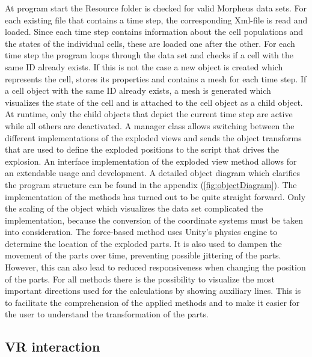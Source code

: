 At program start the Resource folder is checked for valid Morpheus data sets.
For each existing file that contains a time step, the corresponding Xml-file is read and loaded. 
Since each time step contains information about the cell populations and the states of the individual cells, these are loaded one after the other.
For each time step the program loops through the data set and checks if a cell with the same ID already exists. If this is not the case a new object is created which represents the cell, stores its properties and contains a mesh for each time step. 
If a cell object with the same ID already exists, a mesh is generated which visualizes the state of the cell and is attached to the cell object as a child object.
At runtime, only the child objects that depict the current time step are active while all others are deactivated.
A manager class allows switching between the different implementations of the exploded views and sends the object transforms that are used to define the exploded positions to the script that drives the explosion. 
An interface implementation of the exploded view method allows for an extendable usage and development. 
A detailed object diagram which clarifies the program structure can be found in the appendix (\ref{fig:objectDiagram}).
The implementation of the methods has turned out to be quite straight forward. Only the scaling of the object which visualizes the data set complicated the implementation, because the conversion of the coordinate systems must be taken into consideration. 
The force-based method uses Unity's physics engine to determine the location of the exploded parts.
It is also used to dampen the movement of the parts over time, preventing possible jittering of the parts. 
However, this can also lead to reduced responsiveness when changing the position of the parts.
For all methods there is the possibility to visualize the most important directions used for the calculations by showing auxiliary lines. 
This is to facilitate the comprehension of the applied methods and to make it easier for the user to understand the transformation of the parts.

\subsection{VR interaction}

